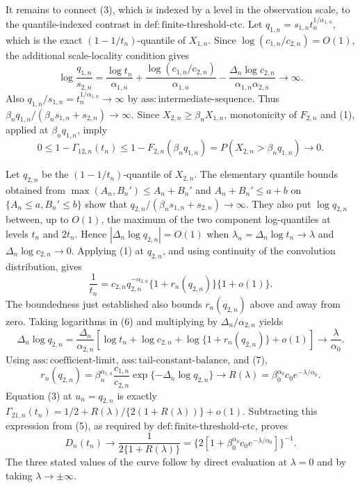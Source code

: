 It remains to connect (3), which is indexed by a level in the observation scale, to the quantile-indexed contrast in \(\mathrm{def{:}finite\text{-}threshold\text{-}ctc}\).  Let \(q_{1,n}=s_{1,n}t_n^{1/\alpha_{1,n}}\), which is the exact \((1-1/t_n)\)-quantile of \(X_{1,n}\).  Since \(\log(c_{1,n}/c_{2,n})=O(1)\), the additional scale-locality condition gives
\[
 \log\frac{q_{1,n}}{s_{2,n}}
 =\frac{\log t_n}{\alpha_{1,n}}
  +\frac{\log(c_{1,n}/c_{2,n})}{\alpha_{1,n}}
  -\frac{\Delta_n\log c_{2,n}}{\alpha_{1,n}\alpha_{2,n}}
 \longrightarrow\infty. \tag{4}
\]
Also \(q_{1,n}/s_{1,n}=t_n^{1/\alpha_{1,n}}\to\infty\) by \(\mathrm{ass{:}intermediate\text{-}sequence}\).  Thus
\(\beta_nq_{1,n}/(\beta_ns_{1,n}+s_{2,n})\to\infty\).  Since \(X_{2,n}\geq\beta_nX_{1,n}\), monotonicity of \(F_{2,n}\) and (1), applied at \(\beta_nq_{1,n}\), imply
\[
 0\leq1-\Gamma_{12,n}(t_n)
 \leq 1-F_{2,n}(\beta_nq_{1,n})
 =P(X_{2,n}>\beta_nq_{1,n})\longrightarrow0. \tag{5}
\]

Let \(q_{2,n}\) be the \((1-1/t_n)\)-quantile of \(X_{2,n}\).  The elementary quantile bounds obtained from
\(\max(A_n,B_n')\leq A_n+B_n'\) and
\(A_n+B_n'\leq a+b\) on \(\{A_n\leq a,B_n'\leq b\}\) show that \(q_{2,n}/(\beta_ns_{1,n}+s_{2,n})\to\infty\).  They also put \(\log q_{2,n}\) between, up to \(O(1)\), the maximum of the two component log-quantiles at levels \(t_n\) and \(2t_n\).  Hence \(|\Delta_n\log q_{2,n}|=O(1)\) when \(\lambda_n=\Delta_n\log t_n\to\lambda\) and \(\Delta_n\log c_{2,n}\to0\).  Applying (1) at \(q_{2,n}\), and using continuity of the convolution distribution, gives
\[
 \frac1{t_n}
 =c_{2,n}q_{2,n}^{-\alpha_{2,n}}
   \{1+r_n(q_{2,n})\}\{1+o(1)\}. \tag{6}
\]
The boundedness just established also bounds \(r_n(q_{2,n})\) above and away from zero.  Taking logarithms in (6) and multiplying by \(\Delta_n/\alpha_{2,n}\) yields
\[
 \Delta_n\log q_{2,n}
 =\frac{\Delta_n}{\alpha_{2,n}}
   \left[\log t_n+\log c_{2,n}
   +\log\{1+r_n(q_{2,n})\}+o(1)\right]
 \longrightarrow\frac{\lambda}{\alpha_0}. \tag{7}
\]
Using \(\mathrm{ass{:}coefficient\text{-}limit}\), \(\mathrm{ass{:}tail\text{-}constant\text{-}balance}\), and (7),
\[
 r_n(q_{2,n})
 =\beta_n^{\alpha_{1,n}}\frac{c_{1,n}}{c_{2,n}}
   \exp\{-\Delta_n\log q_{2,n}\}
 \longrightarrow R(\lambda)
 =\beta_0^{\alpha_0}c_0e^{-\lambda/\alpha_0}. \tag{8}
\]
Equation (3) at \(u_n=q_{2,n}\) is exactly
\(\Gamma_{21,n}(t_n)=1/2+R(\lambda)/\{2(1+R(\lambda))\}+o(1)\).  Subtracting this expression from (5), as required by \(\mathrm{def{:}finite\text{-}threshold\text{-}ctc}\), proves
\[
 D_n(t_n)\longrightarrow
 \frac1{2\{1+R(\lambda)\}}
 =\{2[1+\beta_0^{\alpha_0}c_0e^{-\lambda/\alpha_0}]\}^{-1}.
\]
The three stated values of the curve follow by direct evaluation at \(\lambda=0\) and by taking \(\lambda\to\pm\infty\).